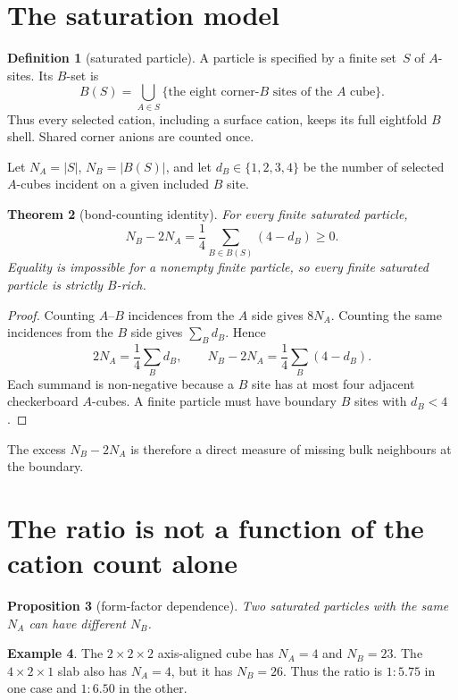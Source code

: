 \documentclass[11pt]{article}
\theoremstyle{plain}
\newtheorem{theorem}{Theorem}[section]
\newtheorem{proposition}[theorem]{Proposition}
\theoremstyle{definition}
\newtheorem{definition}[theorem]{Definition}
\newtheorem{example}[theorem]{Example}
\theoremstyle{remark}
\newcommand{\NA}{N_{\!A}}
\newcommand{\NB}{N_{\!B}}
\begin{document}
\section{The saturation model}

\begin{definition}[saturated particle]
A particle is specified by a finite set~$S$ of $A$-sites.  Its $B$-set is
\[
B(S)=\bigcup_{A\in S}\{\text{the eight corner-$B$ sites of the $A$ cube}\}.
\]
Thus every selected cation, including a surface cation, keeps its full
eightfold $B$ shell.  Shared corner anions are counted once.
\end{definition}

Let $\NA=|S|$, $\NB=|B(S)|$, and let $d_B\in\{1,2,3,4\}$ be the number of
selected $A$-cubes incident on a given included $B$ site.

\begin{theorem}[bond-counting identity]\label{thm:bond}
For every finite saturated particle,
\[
\boxed{\;\NB-2\NA=\frac14\sum_{B\in B(S)}(4-d_B)\ge 0.\;}
\]
Equality is impossible for a nonempty finite particle, so every finite saturated
particle is strictly $B$-rich.
\end{theorem}

\begin{proof}
Counting $A$--$B$ incidences from the $A$ side gives $8\NA$.  Counting the same
incidences from the $B$ side gives $\sum_B d_B$.  Hence
\[
2\NA=\frac14\sum_B d_B,
\qquad
\NB-2\NA=\frac14\sum_B(4-d_B).
\]
Each summand is non-negative because a $B$ site has at most four adjacent
checkerboard $A$-cubes.  A finite particle must have boundary $B$ sites with
$d_B<4$.
\end{proof}

The excess $\NB-2\NA$ is therefore a direct measure of missing bulk neighbours
at the boundary.

\section{The ratio is not a function of the cation count alone}

\begin{proposition}[form-factor dependence]\label{prop:nonuniv}
Two saturated particles with the same $\NA$ can have different $\NB$.
\end{proposition}

\begin{example}
The $2\times2\times2$ axis-aligned cube has $\NA=4$ and $\NB=23$.  The
$4\times2\times1$ slab also has $\NA=4$, but it has $\NB=26$.  Thus the ratio is
$1{:}5.75$ in one case and $1{:}6.50$ in the other.
\end{example}
\end{document}
